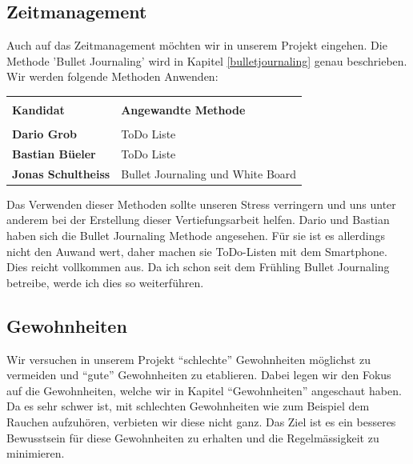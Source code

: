 \subsection{Zeitmanagement}
\authortoc{\jonas}{\subsectionident}
Auch auf das Zeitmanagement möchten wir in unserem Projekt eingehen. Die Methode 'Bullet Journaling' wird in Kapitel \ref{bulletjournaling} genau beschrieben. Wir werden folgende Methoden Anwenden:
\newline
\begin{table}[htp]
  \begin{tabularx}{\textwidth}{l X}\hline \\
    \textbf{Kandidat} & \textbf{Angewandte Methode}  \\\hline \\
    \textbf{Dario Grob} & ToDo Liste \\
    \textbf{Bastian Büeler} & ToDo Liste \\
    \textbf{Jonas Schultheiss} & Bullet Journaling und White Board
    \\\hline
  \end{tabularx}
\end{table}
\newline
Das Verwenden dieser Methoden sollte unseren Stress verringern und uns unter anderem bei der Erstellung dieser Vertiefungsarbeit helfen. Dario und Bastian haben sich die Bullet Journaling Methode angesehen. Für sie ist es allerdings nicht den Auwand wert, daher machen sie ToDo-Listen mit dem Smartphone. Dies reicht vollkommen aus. Da ich schon seit dem Frühling Bullet Journaling betreibe, werde ich dies so weiterführen.
\subsection{Gewohnheiten}
\authortoc{\dario}{\subsectionident}
Wir versuchen in unserem Projekt “schlechte” Gewohnheiten möglichst zu vermeiden und “gute” Gewohnheiten zu etablieren. Dabei legen wir den Fokus auf die Gewohnheiten, welche wir in Kapitel “Gewohnheiten” angeschaut haben.
\newline
Da es sehr schwer ist, mit schlechten Gewohnheiten wie zum Beispiel dem Rauchen aufzuhören, verbieten wir diese nicht ganz. Das Ziel ist es ein besseres Bewusstsein für diese Gewohnheiten zu erhalten und die Regelmässigkeit zu minimieren.
